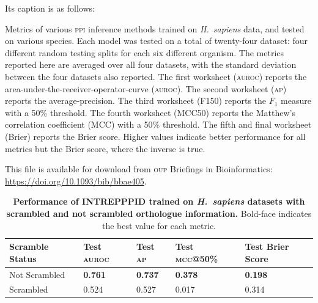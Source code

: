 Its caption is as follows:

\begin{displayquote}
\begin{singlespace}
Metrics of various \textsc{ppi} inference methods trained on \textit{H.~sapiens} data, and tested on various species. Each model was tested on a total of twenty-four dataset: four different random testing splits for each six different organism. The metrics reported here are averaged over all four datasets, with the standard deviation between the four datasets also reported. The first worksheet (\textsc{auroc}) reports the area-under-the-receiver-operator-curve (\textsc{auroc}). The second worksheet (\textsc{ap}) reports the average-precision. The third worksheet (F150) reports the $F_1$ measure with a 50\% threshold.
The fourth worksheet (MCC50) reports the Matthew's correlation coefficient (\textsc{MCC}) with a 50\% threshold. The fifth and final worksheet (Brier) reports the Brier score. Higher values indicate better performance for all metrics but the Brier score, where the inverse is true.
\end{singlespace}
\end{displayquote}

\begin{tcolorbox}
    This file is available for download from \textsc{oup} Briefings in Bioinformatics:\\ \href{https://doi.org/10.1093/bib/bbae405}{https://doi.org/10.1093/bib/bbae405}.
\end{tcolorbox}

\newpage

\begin{table}[!h]
\centering
	\caption[Performance of \textsc{intrepppid} with scrambled and not scrambled orthologue information.]{\textsf{\textbf{Performance of INTREPPPID trained on \textit{H.~sapiens} datasets with scrambled and not
scrambled orthologue information.}} Bold-face indicates the best value for each metric.} \label{tab:intrepppid_supp_scramble} {\begin{tabular}{@{}lllll@{}}\toprule 
			Scramble Status & Test \textsc{auroc} & Test \textsc{ap} & Test \textsc{mcc}@50\% & Test Brier Score  \\\midrule
			Not Scrambled & \textbf{0.761} & \textbf{0.737} & \textbf{0.378} & \textbf{0.198} \\
            Scrambled & 0.524 & 0.527 & 0.017 & 0.314 \\
			\midrule
	\end{tabular}}{}

\end{table}

